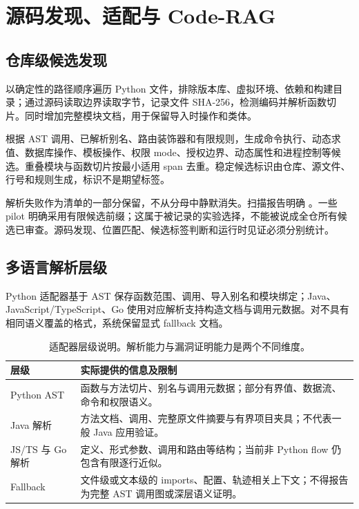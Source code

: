 \section{源码发现、适配与 Code-RAG}
\subsection{仓库级候选发现}
 以确定性的路径顺序遍历 Python 文件，排除版本库、虚拟环境、依赖和构建目录；通过源码读取边界读取字节，记录文件 SHA-256，检测编码并解析函数切片。同时增加完整模块文档，用于保留导入时操作和类体。

 根据 AST 调用、已解析别名、路由装饰器和有限规则，生成命令执行、动态求值、数据库操作、模板操作、权限 mode、授权边界、动态属性和进程控制等候选。重叠模块与函数切片按最小适用 span 去重。稳定候选标识由仓库、源文件、行号和规则生成，标识不是期望标签。

解析失败作为清单的一部分保留，不从分母中静默消失。扫描报告明确 。一些 pilot 明确采用有限候选前缀；这属于被记录的实验选择，不能被说成全仓所有候选已审查。源码发现、位置匹配、候选标签判断和运行时见证必须分别统计。

\subsection{多语言解析层级}
Python 适配器基于 AST 保存函数范围、调用、导入别名和模块绑定；Java、JavaScript/TypeScript、Go 使用对应解析支持构造文档与调用元数据。对不具有相同语义覆盖的格式，系统保留显式 fallback 文档。

\begin{table}[htbp]
\centering\small
\begin{tabularx}{\textwidth}{L{32mm}Y}
\toprule 层级 & 实际提供的信息及限制\\\midrule
Python AST & 函数与方法切片、别名与调用元数据；部分有界值、数据流、命令和权限语义。\\
Java 解析 & 方法文档、调用、完整原文件摘要与有界项目夹具；不代表一般 Java 应用验证。\\
JS/TS 与 Go 解析 & 定义、形式参数、调用和路由等结构；当前非 Python flow 仍包含有限逐行近似。\\
Fallback & 文件级或文本级的 imports、配置、轨迹相关上下文；不得报告为完整 AST 调用图或深层语义证明。\\
\bottomrule
\end{tabularx}
\caption{适配器层级说明。解析能力与漏洞证明能力是两个不同维度。}
\end{table}

